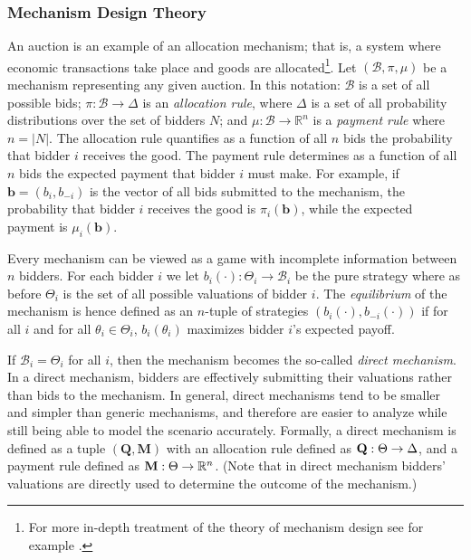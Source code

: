 \subsubsection{Mechanism Design Theory} %
\label{ssub:mechanism_design_theory_notation}
An auction is an example of an allocation mechanism; that is, a system where economic transactions take place and goods are allocated\footnote{For more in-depth treatment of the theory of mechanism design see for example \cite{MechDesign07,Krishna10,HarrisRaviv1981,HarrisTownsend1975,Myerson1979,Myerson1981}.}. Let $(\mathcal{B},\pi,\mu)$ be a mechanism representing any given auction. In this notation: $\mathcal{B}$ is a set of all possible bids; $\pi: \mathcal{B}\to \Delta$ is an \emph{allocation rule}, where $\Delta$ is a set of all probability distributions over the set of bidders $N$; and $\mu:\mathcal{B}\to\mathbb{R}^n$ is a \emph{payment rule} where $n = |N|$. The allocation rule quantifies as a function of all $n$ bids the probability that bidder $i$ receives the good. The payment rule determines as a function of all $n$ bids the expected payment that bidder $i$ must make. For example, if $\mathbf{b}=(b_i,b_{-i})$ is the vector of all bids submitted to the mechanism, the probability that bidder $i$ receives the good is $\pi_i(\mathbf{b})$, while the expected payment is $\mu_i(\mathbf{b})$.

Every mechanism can be viewed as a game with incomplete information between $n$ bidders. For each bidder $i$ we let $b_i(\cdot): \Theta_i \to\mathcal{B}_i$ be the pure strategy where as before $\Theta_i$ is the set of all possible valuations of bidder $i$. The \emph{equilibrium} of the mechanism is hence defined as an $n$-tuple of strategies $(b_i(\cdot),b_{-i}(\cdot))$ if for all $i$ and for all $\theta_i\in\Theta_i$, $b_i(\theta_i)$ maximizes bidder $i$'s expected payoff.

If $\mathcal{B}_i = \Theta_i$ for all $i$, then the mechanism becomes the so-called \emph{direct mechanism}. In a direct mechanism, bidders are effectively submitting their valuations rather than bids to the mechanism. In general, direct mechanisms tend to be smaller and simpler than generic mechanisms, and therefore are easier to analyze while still being able to model the scenario accurately. Formally, a direct mechanism is defined as a tuple $(\mathbf{Q},\mathbf{M})$ with an allocation rule defined as $\mathbf{Q}:\nobreak\Theta\to\Delta$, and a payment rule defined as $\mathbf{M}:\nobreak\Theta\to\mathbb{R}^n$. (Note that in direct mechanism bidders' valuations are directly used to determine the outcome of the mechanism.)

